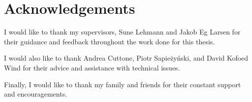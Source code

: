 \chapter{Acknowledgements}

I would like to thank my supervisors, Sune Lehmann and Jakob Eg Larsen for their
guidance and feedback throughout the work done for this thesis.

I would also like to thank Andrea Cuttone, Piotr Sapieżyński, and David Kofoed
Wind for their advice and assistance with technical issues.

Finally, I would like to thank my family and friends for their constant support
and encouragements.

